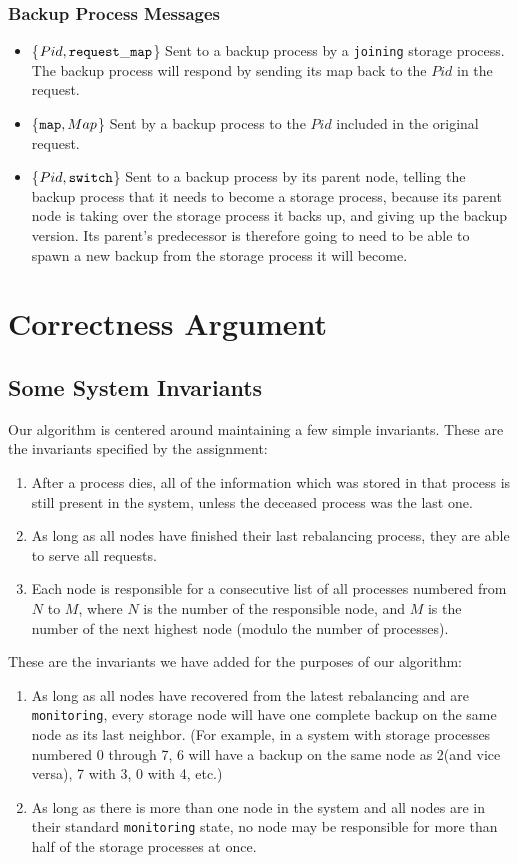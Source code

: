 \documentclass[a4paper]{article}
\begin{document}
\subsubsection{Backup Process Messages}

\begin{itemize}
\item\{$Pid, {\tt request\_map}$\} Sent to a backup process by a {\tt joining} storage process. The backup process will respond by sending its map back to the $Pid$ in the request.
\item\{${\tt map}, Map$\} Sent by a backup process to the $Pid$ included in the original request.
\item\{$Pid, {\tt switch}$\} Sent to a backup process by its parent node, telling the backup process that it needs to become a storage process, because its parent node is taking over the storage process it backs up, and giving up the backup version. Its parent's predecessor is therefore going to need to be able to spawn a new backup from the storage process it will become.
\end{itemize}

\section{Correctness Argument}

\subsection{Some System Invariants}

Our algorithm is centered around maintaining a few simple invariants. These are the invariants specified by the assignment:
\begin{enumerate}
\item After a process dies, all of the information which was stored in that process is still present in the system, unless the deceased process was the last one.
\item As long as all nodes have finished their last rebalancing process, they are able to serve all requests.
\item Each node is responsible for a consecutive list of all processes numbered from $N$ to $M$, where $N$ is the number of the responsible node, and $M$ is the number of the next highest node (modulo the number of processes).
\end{enumerate}
These are the invariants we have added for the purposes of our algorithm:
\begin{enumerate}
\item As long as all nodes have recovered from the latest rebalancing and are {\tt monitoring}, every storage node will have one complete backup on the same node as its last neighbor. (For example, in a system with storage processes numbered 0 through 7, 6 will have a backup on the same node as 2(and vice versa), 7 with 3, 0 with 4, etc.)
\item As long as there is more than one node in the system and all nodes are in their standard {\tt monitoring} state, no node may be responsible for more than half of the storage processes at once.
\end{enumerate}
\end{document}
